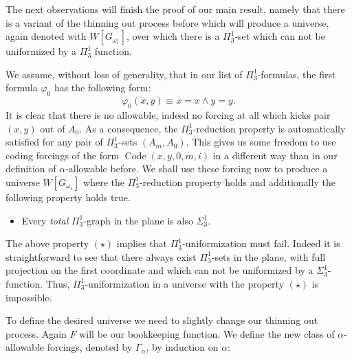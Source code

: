 \documentclass[a4paper,11pt]{article}
\begin{document}
The next observations will finish the proof of our main result, namely that there is a variant of the thinning out process before which will produce a universe, again denoted with $W[G_{\omega_1}]$, over which there is a $\Pi^1_3$-set which can not be uniformized by a $\Pi^1_3$ function.  

 We assume, without loss of generality, that in our list of $\Pi^1_3$-formulas, the first formula $\varphi_0$ has the following form: \[\varphi_0(x,y) \equiv x=x \land y=y.\] It is clear that there is no allowable, indeed no forcing at all which kicks pair $(x,y)$ out of $A_0$. 
As a consequence, the $\Pi^1_3$-reduction property is automatically satisfied for any pair of $\Pi^1_3$-sets $(A_m,A_0)$. This gives us some freedom to use coding forcings of the form $\operatorname{Code} (x,y,0,m,i)$ in a different way than in our definition of $\alpha$-allowable before. We shall use these forcing now to produce a universe $W[G_{\omega_1}]$ where the $\Pi^1_3$-reduction property holds and additionally the following property holds true.
\begin{itemize}
    \item[$(\star)$] Every \emph{total} $\Pi^1_3$-graph in the plane is also $\Sigma^1_3$.

\end{itemize}
The above property $(\star)$ implies that $\Pi^1_3$-uniformization must fail. Indeed it is straightforward
to see that there always exist $\Pi^1_3$-sets in the plane, with full projection on the first coordinate and which can not be uniformized by a $\Sigma^1_3$-function. Thus, $\Pi^1_3$-uniformization in a universe with the property $(\star)$ is impossible.

To define the desired universe we need to slightly change our thinning out process. Again $F$ will be our bookkeeping function. 
We define the new class of $\alpha$-allowable forcings, denoted by $\Gamma_\alpha$, by induction on $\alpha$:
\end{document}
